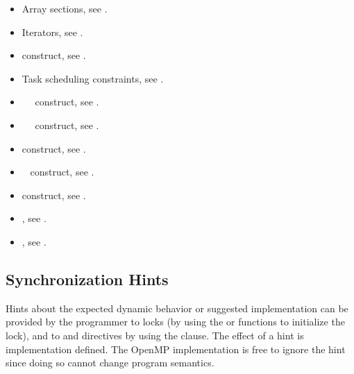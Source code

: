 \crossreferences
\begin{itemize}
\item Array sections, see
.

\item Iterators, see .

\item {} construct, see
.

\item Task scheduling constraints, see .

\item {}~~ construct, see
.

\item {}~~ construct, see
.

\item {} construct, see
.

\item {}~ construct, see
.

\item {} construct, see
.

\item {}, see
.

\item {}, see
.
\end{itemize}

\subsection{Synchronization Hints}
\label{subsec:Synchronization Hints}
Hints about the expected dynamic behavior or suggested implementation
can be provided by the programmer to locks (by using
the  or
 functions to initialize the lock), and to
 and  directives by using the 
clause.  The effect of a hint is implementation defined. The OpenMP
implementation is free to ignore the hint since doing so cannot change
program semantics.

